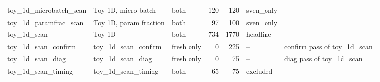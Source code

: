 \begin{tabular}{lllrrll}
toy\_1d\_microbatch\_scan & Toy 1D, micro-batch & both & 120 & 120 & sven\_only &  \\
toy\_1d\_paramfrac\_scan & Toy 1D, param fraction & both & 97 & 100 & sven\_only &  \\
toy\_1d\_scan & Toy 1D & both & 734 & 1770 & headline &  \\
toy\_1d\_scan\_confirm & toy\_1d\_scan\_confirm & fresh only & 0 & 225 & -- & confirm pass of toy\_1d\_scan \\
toy\_1d\_scan\_diag & toy\_1d\_scan\_diag & fresh only & 0 & 75 & -- & diag pass of toy\_1d\_scan \\
toy\_1d\_scan\_timing & toy\_1d\_scan\_timing & both & 65 & 75 & excluded &  \\
\bottomrule
\end{tabular}
